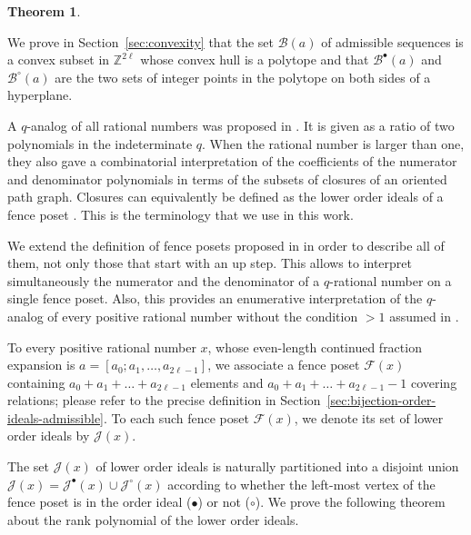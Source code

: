 \documentclass[a4paper,12pt]{amsart}
\newtheorem{maintheorem}{Theorem}
\newcommand{\Z}{\mathbb{Z}}
\newcommand{\xx}{{x}}
\newcommand{\Bcal}{{\mathcal{B}}}
\newcommand{\Fcal}{{\mathcal{F}}}
\newcommand{\Jcal}{{\mathcal{J}}}
\newcommand{\0}{\mathtt{0}}
\newcommand{\1}{\mathtt{1}}
\newcommand{\2}{\mathtt{2}}
\newcommand{\3}{\mathtt{3}}
\begin{document}
\begin{maintheorem}\label{thm:1-norm-statistics}
\MainTheoremB
\end{maintheorem}

We prove in Section~\ref{sec:convexity} that the set $\Bcal(a)$ of admissible
sequences is a convex subset in $\Z^{2\ell}$
whose convex hull is a polytope
and that $\Bcal^\bullet(a)$ and
$\Bcal^\circ(a)$ are the two sets of integer points in the polytope
on both sides of a hyperplane.

A $q$-analog of all rational numbers was proposed in \cite{MR4073883}.
It is given as a ratio of two polynomials in the indeterminate $q$.
When the rational number is larger than one, they also gave a combinatorial
interpretation of the coefficients of the numerator and denominator
polynomials in terms of the subsets of closures of an oriented path graph.
Closures can equivalently be defined as the lower order ideals of a fence poset
\cite{MR4266256,MR4499341}. This is the terminology that we use in this work.


We extend the definition of fence posets proposed in
\cite{MR4266256,MR4499341} in order to describe all of them, not only those
that start with an up step.
This allows to interpret simultaneously the numerator and the denominator
of a $q$-rational number on a single fence poset.
Also, this provides an enumerative interpretation of the $q$-analog of
every positive rational number without the condition $>1$ assumed in \cite{MR4073883}.


To every positive rational number $x$,
whose even-length continued fraction expansion is
$a=[a_0;a_1,\dots,a_{2\ell-1}]$,
we associate a fence poset $\Fcal(\xx)$ containing
$a_0+a_1+\dots+a_{2\ell-1}$ elements
and $a_0+a_1+\dots+a_{2\ell-1}-1$ covering relations;
please refer to the precise definition in
Section~\ref{sec:bijection-order-ideals-admissible}.
To each such fence poset $\Fcal(\xx)$, we denote
its set of lower order ideals by $\Jcal(\xx)$.

The set $\Jcal(\xx)$ of lower order ideals
is naturally partitioned into a disjoint union
$\Jcal(\xx)= \Jcal^\bullet(\xx) \cup \Jcal^\circ(\xx)$
according to whether the left-most vertex of the fence poset is in the order
ideal ($\bullet$) or not ($\circ$).
We prove the following theorem
about the rank polynomial of the lower order ideals.
\end{document}
